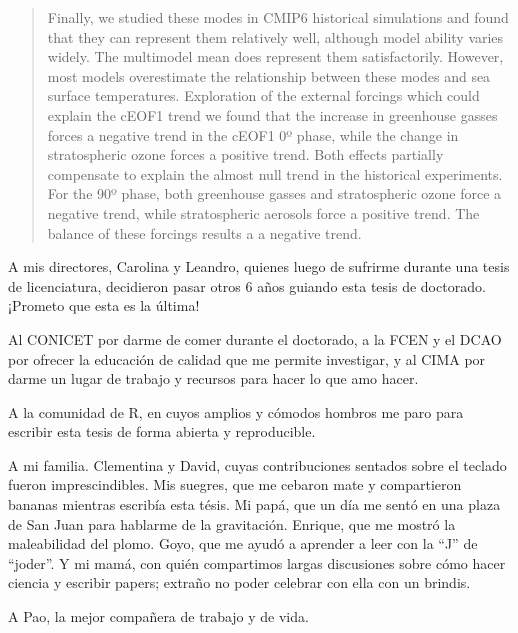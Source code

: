 \documentclass[12pt,oneside,a4paper]{reedthesis}
\begin{document}
\begin{abstract}
    Finally, we studied these modes in CMIP6 historical simulations and found that they can represent them relatively well, although model ability varies widely.
    The multimodel mean does represent them satisfactorily.
    However, most models overestimate the relationship between these modes and sea surface temperatures.
    Exploration of the external forcings which could explain the cEOF1 trend we found that the increase in greenhouse gasses forces a negative trend in the cEOF1 0º phase, while the change in stratospheric ozone forces a positive trend.
    Both effects partially compensate to explain the almost null trend in the historical experiments.
    For the 90º phase, both greenhouse gasses and stratospheric ozone force a negative trend, while stratospheric aerosols force a positive trend.
    The balance of these forcings results a a negative trend.
  \end{abstract}



  \begin{acknowledgements}
    A mis directores, Carolina y Leandro, quienes luego de sufrirme durante una tesis de licenciatura, decidieron pasar otros 6 años guiando esta tesis de doctorado.
    ¡Prometo que esta es la última!

    Al CONICET por darme de comer durante el doctorado, a la FCEN y el DCAO por ofrecer la educación de calidad que me permite investigar, y al CIMA por darme un lugar de trabajo y recursos para hacer lo que amo hacer.

    A la comunidad de R, en cuyos amplios y cómodos hombros me paro para escribir esta tesis de forma abierta y reproducible.

    A mi familia.
    Clementina y David, cuyas contribuciones sentados sobre el teclado fueron imprescindibles.
    Mis suegres, que me cebaron mate y compartieron bananas mientras escribía esta tésis.
    Mi papá, que un día me sentó en una plaza de San Juan para hablarme de la gravitación.
    Enrique, que me mostró la maleabilidad del plomo.
    Goyo, que me ayudó a aprender a leer con la ``J'' de ``joder''.
    Y mi mamá, con quién compartimos largas discusiones sobre cómo hacer ciencia y escribir papers; extraño no poder celebrar con ella con un brindis.

    A Pao, la mejor compañera de trabajo y de vida.
  \end{acknowledgements}


  \hypersetup{linkcolor=black}
  \setcounter{secnumdepth}{2}
  \setcounter{tocdepth}{2}
  \tableofcontents
\end{document}
